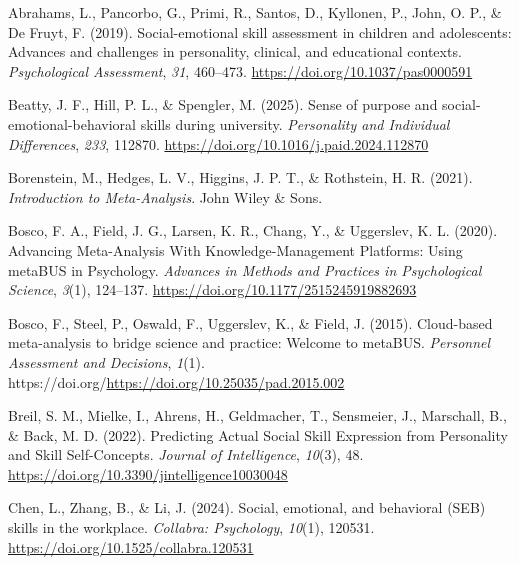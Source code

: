 \documentclass[
  man,
  longtable,
  nolmodern,
  notxfonts,
  notimes,
  colorlinks=true,linkcolor=blue,citecolor=blue,urlcolor=blue]{apa7}
\newlength{\cslhangindent}
\newenvironment{CSLReferences}[2] %
 {\begin{list}{}{%
  \setlength{\itemindent}{0pt}
  \setlength{\leftmargin}{0pt}
  \setlength{\parsep}{0pt}
  \ifodd #1
   \setlength{\leftmargin}{\cslhangindent}
   \setlength{\itemindent}{-1\cslhangindent}
  \fi
  \setlength{\itemsep}{#2\baselineskip}}}
 {\end{list}}
\begin{document}
\label{refs}
\begin{CSLReferences}{1}{0}
Abrahams, L., Pancorbo, G., Primi, R., Santos, D., Kyllonen, P., John,
O. P., \& De Fruyt, F. (2019). Social-emotional skill assessment in
children and adolescents: Advances and challenges in personality,
clinical, and educational contexts. \emph{Psychological Assessment},
\emph{31}, 460--473. \url{https://doi.org/10.1037/pas0000591}

Beatty, J. F., Hill, P. L., \& Spengler, M. (2025). Sense of purpose and
social-emotional-behavioral skills during university. \emph{Personality
and Individual Differences}, \emph{233}, 112870.
\url{https://doi.org/10.1016/j.paid.2024.112870}

Borenstein, M., Hedges, L. V., Higgins, J. P. T., \& Rothstein, H. R.
(2021). \emph{Introduction to Meta-Analysis}. John Wiley \& Sons.

Bosco, F. A., Field, J. G., Larsen, K. R., Chang, Y., \& Uggerslev, K.
L. (2020). Advancing Meta-Analysis With Knowledge-Management Platforms:
Using metaBUS in Psychology. \emph{Advances in Methods and Practices in
Psychological Science}, \emph{3}(1), 124--137.
\url{https://doi.org/10.1177/2515245919882693}

Bosco, F., Steel, P., Oswald, F., Uggerslev, K., \& Field, J. (2015).
Cloud-based meta-analysis to bridge science and practice: Welcome to
metaBUS. \emph{Personnel Assessment and Decisions}, \emph{1}(1).
https://doi.org/\url{https://doi.org/10.25035/pad.2015.002}

Breil, S. M., Mielke, I., Ahrens, H., Geldmacher, T., Sensmeier, J.,
Marschall, B., \& Back, M. D. (2022). Predicting Actual Social Skill
Expression from Personality and Skill Self-Concepts. \emph{Journal of
Intelligence}, \emph{10}(3), 48.
\url{https://doi.org/10.3390/jintelligence10030048}

Chen, L., Zhang, B., \& Li, J. (2024). Social, emotional, and behavioral
(SEB) skills in the workplace. \emph{Collabra: Psychology},
\emph{10}(1), 120531. \url{https://doi.org/10.1525/collabra.120531}


\end{CSLReferences}
\end{document}
